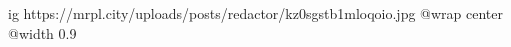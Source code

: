  
 
 
 
 

\ifcmt
  ig https://mrpl.city/uploads/posts/redactor/kz0sgstb1mloqoio.jpg
  @wrap center
  @width 0.9
\fi

